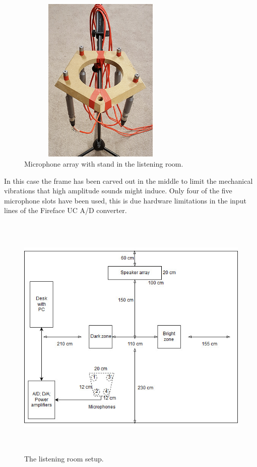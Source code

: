 \begin{figure}[H]
\centering
\includegraphics[width=8cm,height=8cm,keepaspectratio]{Figures/micslistening}
\decoRule
\caption[Microphone array in the listening room]{Microphone array with stand in the listening room.}
\label{fig:micslistening}
\end{figure}

In this case the frame has been carved out in the middle to limit the mechanical vibrations that high amplitude sounds might induce. Only four of the five microphone slots have been used, this is due hardware limitations in the input lines of the Fireface UC A/D converter.

\begin{figure}[H]
\centering
\includegraphics[width=13cm,height=12cm,keepaspectratio]{Figures/listeningsetup}
\decoRule
\caption[Listening room setup]{The listening room setup.}
\label{fig:listeningsetup}
\end{figure}

